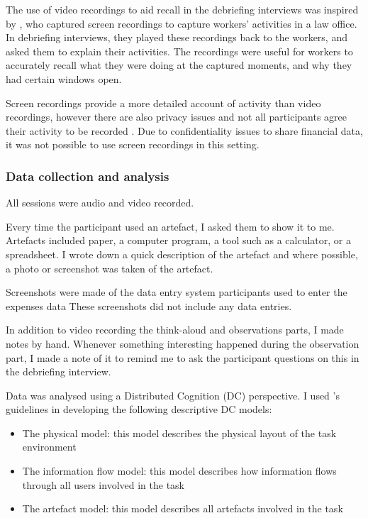 The use of video recordings to aid recall in the debriefing interviews was inspired by \citet{Cangiano2009}, who captured screen recordings to capture workers' activities in a law office. In debriefing interviews, they played these recordings back to the workers, and asked them to explain their activities. The recordings were useful for workers to accurately recall what they were doing at the captured moments, and why they had certain windows open. 

Screen recordings provide a more detailed account of activity than video recordings, however there are also privacy issues and not all participants agree their activity to be recorded \citep{Rule2015}. Due to confidentiality issues to share financial data, it was not possible to use screen recordings in this setting.

\subsubsection{Data collection and analysis}
All sessions were audio and video recorded. 

Every time the participant used an artefact, I asked them to show it to me. Artefacts included paper, a computer program, a tool such as a calculator, or a spreadsheet. I wrote down a quick description of the artefact and where possible, a photo or screenshot was taken of the artefact. 

Screenshots were made of the data entry system participants used to enter the expenses data These screenshots did not include any data entries.

In addition to video recording the think-aloud and observations parts, I made notes by hand. Whenever something interesting happened during the observation part, I made a note of it to remind me to ask the participant questions on this in the debriefing interview.

Data was analysed using a Distributed Cognition (DC) perspective. I used \citet{Furniss2006}'s guidelines in developing the following descriptive DC models:

\begin{itemize}
\item 
The physical model: this model describes the physical layout of the task environment
\item 
The information flow model: this model describes how information flows through all users involved in the task
\item 
The artefact model: this model describes all artefacts involved in the task
\end{itemize}

